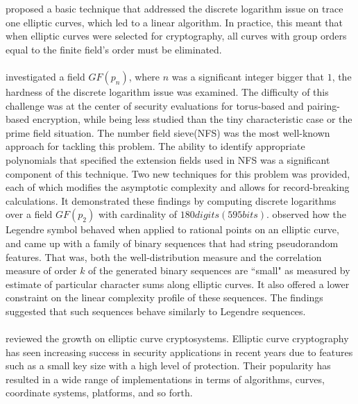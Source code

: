 \cite{Smart1999} proposed a basic technique that addressed the discrete logarithm issue on trace one elliptic curves, which led to a linear algorithm. In practice, this meant that when elliptic curves were selected for cryptography, all curves with group orders equal to the finite field's order must be eliminated.\\\\
\cite{Barbulescu2015} investigated a field $GF(p_{n})$, where $n$ was a significant integer bigger that $1$, the hardness of the discrete logarithm issue was examined. The difficulty of this challenge was at the center of security evaluations for torus-based and pairing-based encryption, while being less studied than the tiny characteristic case or the prime field situation. The number field sieve(NFS) was the most well-known approach for tackling this problem. The ability to identify appropriate polynomials that specified the extension fields used in NFS was a significant component of this technique. Two new techniques for this problem was provided, each of which modifies the asymptotic complexity and allows for record-breaking calculations. It demonstrated these findings by computing discrete logarithms over a field $GF(p_{2})$ with cardinality of $180 digits (595 bits)$.
\cite{Chen2008} observed how the Legendre symbol behaved when applied to rational points on an elliptic curve, and came up with a family of binary sequences that had string pseudorandom features. That was, both the well-distribution measure and the correlation measure of order $k$ of the generated binary sequences are ``small" as measured by estimate of particular character sums along elliptic curves. It also offered a lower constraint on the linear complexity profile of these sequences. The findings suggested that such sequences behave similarly to Legendre sequences.\\\\
\cite{Koblitz2000} reviewed the growth on elliptic curve cryptosystems. Elliptic curve cryptography has seen increasing success in security applications in recent years due to features such as a small key size with a high level of protection. Their popularity has resulted in a wide range of implementations in terms of algorithms, curves, coordinate systems, platforms, and so forth.\\\\
